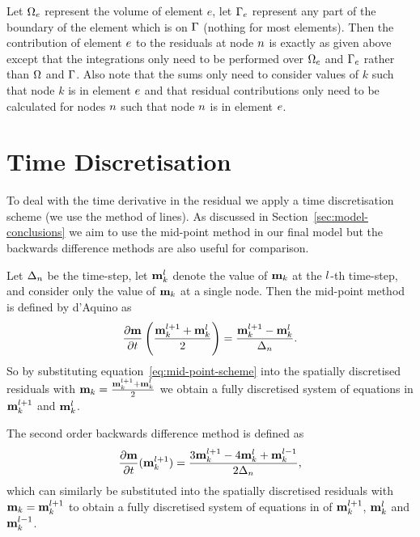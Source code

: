 Let $\Omega_e$ represent the volume of element $e$, let ${\Gamma}_e$ represent any part of the boundary of the element which is on ${\Gamma}$ (nothing for most elements). Then the contribution of element $e$ to the residuals at node $n$ is exactly as given above except that the integrations only need to be performed over $\Omega_e$ and ${\Gamma}_e$ rather than $\Omega$ and ${\Gamma}$. Also note that the sums only need to consider values of $k$ such that node $k$ is in element $e$ and that residual contributions only need to be calculated for nodes $n$ such that node $n$ is in element $e$.


\section{Time Discretisation}
\label{sec:time-discretisation-resi}

To deal with the time derivative in the residual we apply a time discretisation scheme (\ie we use the method of lines). As discussed in Section~\ref{sec:model-conclusions} we aim to use the mid-point method in our final model but the backwards difference methods are also useful for comparison.

Let $\Delta_{n}$ be the time-step, let $\mathbf{m}_k^l$ denote the value of $\mathbf{m}_k$ at the $l$-th time-step, and consider only the value of $\mathbf{m}_k$ at a single node. Then the mid-point method is defined by d'Aquino\cite{DAquino2005} as
\begin{equation}
  \label{eq:mid-point-scheme}
  \frac{\partial \mathbf{m}}{\partial t} \left( \frac{\mathbf{m}_k^{l+1} + \mathbf{m}_k^l}{2} \right) = \frac{\mathbf{m}_k^{l+1} - \mathbf{m}_k^l}{ \Delta_{n}}.
\end{equation}
So by substituting equation~\eqref{eq:mid-point-scheme} into  the spatially discretised residuals with $\mathbf{m}_k = \frac{\mathbf{m}_k^{l+1} + \mathbf{m}^l_k}{2}$ we obtain a fully discretised system of equations in  $\mathbf{m}_k^{l+1}$ and $\mathbf{m}_k^l$.

The second order backwards difference method is defined as\cite{Atkinson2009}
\begin{equation}
  \label{eq:bdf2-scheme}
  \frac{\partial \mathbf{m}}{\partial t}(\mathbf{m}_k^{l+1}) = \frac{3 \mathbf{m}_k^{l+1} - 4 \mathbf{m}_k^{l} + \mathbf{m}_k^{l-1}}{2\Delta_{n}},
\end{equation}
which can similarly be substituted into the spatially discretised residuals with $\mathbf{m}_k = \mathbf{m}_k^{l+1}$ to obtain a fully discretised system of equations in of $\mathbf{m}_k^{l+1}$, $\mathbf{m}_k^l$ and $\mathbf{m}_k^{l-1}$.



